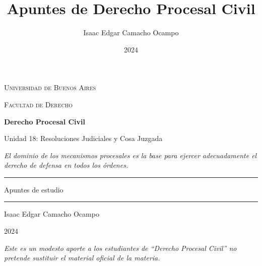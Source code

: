 \documentclass[12pt,oneside]{book}
\title{Apuntes de Derecho Procesal Civil}
\author{Isaac Edgar Camacho Ocampo}
\date{2024}
\newcommand{\universidad}{Universidad de Buenos Aires}
\newcommand{\facultad}{Facultad de Derecho}
\newcommand{\materia}{Derecho Procesal Civil}
\newcommand{\titulo}{Unidad 18: Resoluciones Judiciales y Cosa Juzgada}
\newcommand{\autor}{Isaac Edgar Camacho Ocampo}
\newcommand{\anio}{2024}
\begin{document}

\begin{titlepage}

\thispagestyle{empty}

\begin{center}

\vspace*{1cm}

{\large \textsc{\universidad}}

\vspace{0.2cm}

{\large \textsc{\facultad}}

\vspace{3cm}

{\Huge \textbf{\materia}}

\vspace{1cm}

{\LARGE \titulo}

\vspace{0.8cm}

\textit{El dominio de los mecanismos procesales es la base para ejercer adecuadamente el derecho de defensa en todos los órdenes.}

\vspace{1.2cm}

\rule{0.70\textwidth}{0.5pt}

\vspace{0.5cm}

{\large Apuntes de estudio}

\vspace{0.5cm}

\rule{0.70\textwidth}{0.5pt}

\vfill

{\large \autor}

\vspace{0.3cm}

{\large \anio}

\end{center}

\vfill

\begin{flushleft}
\textit{Este es un modesto aporte a los estudiantes de ``Derecho Procesal Civil'' no pretende sustituir el material oficial de la materia.}
\end{flushleft}

\end{titlepage}
\end{document}
